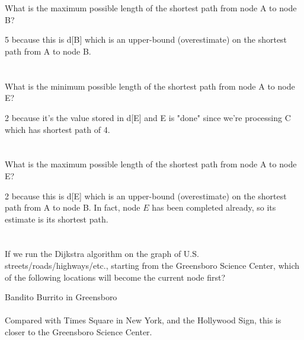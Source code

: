 \documentclass [12pt]{article}
\begin{document}
\section{} What is the maximum possible length of the shortest path from node A to node B?

\begin{Solution}
5 because this is d[B] which is an upper-bound (overestimate) on the shortest path from A to node B.
\end{Solution}


\section{} What is the minimum possible length of the shortest path from node A to node E?

\begin{Solution}
2 because it's the value stored in d[E] and E is "done" since we're processing C which has shortest path of 4.
\end{Solution}


\section{} What is the maximum possible length of the shortest path from node A to node E?

\begin{Solution}
2 because this is d[E] which is an upper-bound (overestimate) on the shortest path from A to node B. In fact, node $E$ has been completed already, so its estimate is its shortest path.
\end{Solution}


\section{} If we run the Dijkstra algorithm on the graph of U.S. streets/roads/highways/etc., starting from the Greensboro Science Center, which of the following locations will become the current node first?

\begin{Solution}
Bandito Burrito in Greensboro
\paragraph{}
Compared with Times Square in New York, and the Hollywood Sign, this is closer to the Greensboro Science Center.
\end{Solution}
\end{document}
